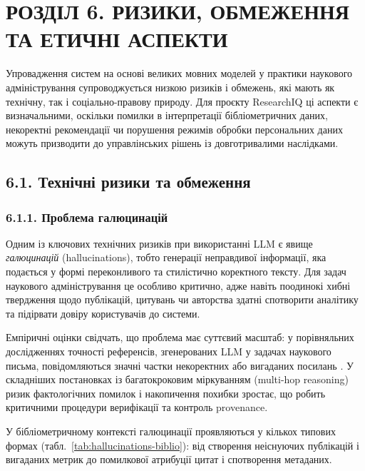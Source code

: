 \section*{РОЗДІЛ 6. РИЗИКИ, ОБМЕЖЕННЯ ТА ЕТИЧНІ АСПЕКТИ}

Упровадження систем на основі великих мовних моделей у практики наукового адміністрування супроводжується низкою ризиків і обмежень, які мають як технічну, так і соціально-правову природу. Для проєкту ResearchIQ ці аспекти є визначальними, оскільки помилки в інтерпретації бібліометричних даних, некоректні рекомендації чи порушення режимів обробки персональних даних можуть призводити до управлінських рішень із довготривалими наслідками.

\subsection*{6.1. Технічні ризики та обмеження}

\subsubsection*{6.1.1. Проблема галюцинацій}

Одним із ключових технічних ризиків при використанні LLM є явище \emph{галюцинацій} (hallucinations), тобто генерації неправдивої інформації, яка подається у формі переконливого та стилістично коректного тексту. Для задач наукового адміністрування це особливо критично, адже навіть поодинокі хибні твердження щодо публікацій, цитувань чи авторства здатні спотворити аналітику та підірвати довіру користувачів до системи.

Емпіричні оцінки свідчать, що проблема має суттєвий масштаб: у порівняльних дослідженнях точності референсів, згенерованих LLM у задачах наукового письма, повідомляються значні частки некоректних або вигаданих посилань \cite{Chelli2024HallucinationRates}. У складніших постановках із багатокроковим міркуванням (multi-hop reasoning) ризик фактологічних помилок і накопичення похибки зростає, що робить критичними процедури верифікації та контроль provenance.

У бібліометричному контексті галюцинації проявляються у кількох типових формах (табл.~\ref{tab:hallucinations-biblio}): від створення неіснуючих публікацій і вигаданих метрик до помилкової атрибуції цитат і спотворення метаданих.

